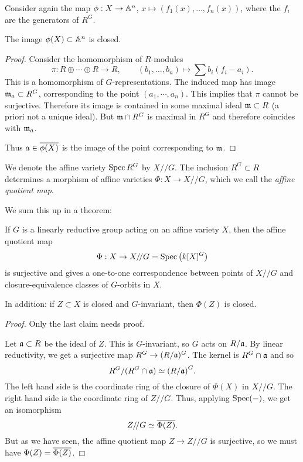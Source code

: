 \documentclass[11pt, english]{article}
\begin{document}
Consider again the map $\phi:X \to \mathbb{A}^n$, $x \mapsto (f_1(x),\ldots,f_n(x))$, where the $f_i$ are the generators of $R^G$. 

\begin{prop}
The image $\phi(X) \subset \mathbb{A}^n$ is closed.
\end{prop}
\begin{proof}
 Consider the homomorphism of $R$-modules
\[
\pi: R \oplus \cdots \oplus R \to R, \qquad (b_1,\ldots,b_n) \mapsto \sum b_i(f_i-a_i).
\]
This is a homomorphism of $G$-representations. The induced map has image $\mathfrak{m}_a \subset R^G$, corresponding to the point $(a_1,\cdots, a_n)$. This implies that $\pi$ cannot be surjective. Therefore its image is contained in some maximal ideal $\mathfrak{m} \subset R$ (a priori not a unique ideal). But $\mathfrak{m}\cap R^G$ is maximal in $R^G$ and therefore coincides with $\mathfrak{m}_a$. 

Thus $a \in \overline{\phi(X)}$ is the image of the point corresponding to $\mathfrak{m}$.
\end{proof}

\begin{defi}
 We denote the affine variety $\operatorname{Spec} R^G$ by $X/\!/G$. The inclusion $R^G \subset R$ determines a morphism of affine varieties $\Phi:X \to X /\!/ G$, which we call the \emph{affine quotient map}.
\end{defi}

We sum this up in a theorem:

\begin{thm}
 If $G$ is a linearly reductive group acting on an affine variety $X$, then the affine quotient map
$$
\Phi: X \to X /\!/ G = \operatorname{Spec} \left(k[X]^G\right)
$$
is surjective and gives a one-to-one correspondence between points of $X /\! / G$ and closure-equivalence classes of $G$-orbits in $X$.

In addition: if $Z \subset X$ is closed and $G$-invariant, then $\Phi(Z)$ is closed.
\end{thm}
\begin{proof}
Only the last claim needs proof.

Let $\mathfrak{a} \subset R$ be the ideal of $Z$. This is $G$-invariant, so $G$ acts on $R/\mathfrak{a}$. By linear reductivity, we get a surjective map $R^G \to (R/\mathfrak{a})^G$. The kernel is $R^G \cap \mathfrak{a}$ and so
\[
R^G/(R^G \cap \mathfrak{a}) \simeq {(R/\mathfrak{a})}^G.
\]
The left hand side is the coordinate ring of the closure of $\Phi(X)$ in $X /\!/ G$. The right hand side is the coordinate ring of $Z /\!/ G$. Thus, applying $\operatorname{Spec}(-)$, we get an isomorphism
$$
Z /\!/ G \simeq \overline{\Phi{(Z)}}.
$$
But as we have seen, the affine quotient map $Z \to Z/\!/ G$ is surjective, so we must have $\Phi(Z) = \overline{\Phi(Z)}$.
\end{proof}
\end{document}
